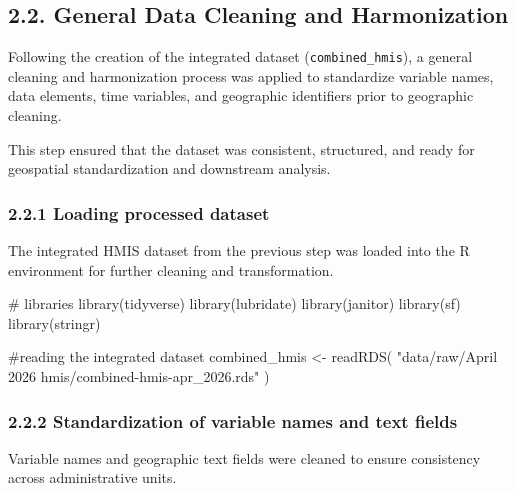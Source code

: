\documentclass[
  letterpaper,
  DIV=11,
  numbers=noendperiod]{scrartcl}
\newenvironment{Shaded}{\begin{snugshade}}{\end{snugshade}}
\newcommand{\CommentTok}[1]{\textcolor[rgb]{0.37,0.37,0.37}{#1}}
\newcommand{\FunctionTok}[1]{\textcolor[rgb]{0.28,0.35,0.67}{#1}}
\newcommand{\NormalTok}[1]{\textcolor[rgb]{0.00,0.23,0.31}{#1}}
\newcommand{\OtherTok}[1]{\textcolor[rgb]{0.00,0.23,0.31}{#1}}
\newcommand{\StringTok}[1]{\textcolor[rgb]{0.13,0.47,0.30}{#1}}
\begin{document}
\subsection{2.2. General Data Cleaning and
Harmonization}\label{general-data-cleaning-and-harmonization}

Following the creation of the integrated dataset
(\texttt{combined\_hmis}), a general cleaning and harmonization process
was applied to standardize variable names, data elements, time
variables, and geographic identifiers prior to geographic cleaning.

This step ensured that the dataset was consistent, structured, and ready
for geospatial standardization and downstream analysis.

\subsubsection{2.2.1 Loading processed
dataset}\label{loading-processed-dataset}

The integrated HMIS dataset from the previous step was loaded into the R
environment for further cleaning and transformation.

\begin{Shaded}
\begin{Highlighting}[]
\CommentTok{\# libraries }
\FunctionTok{library}\NormalTok{(tidyverse) }
\FunctionTok{library}\NormalTok{(lubridate) }
\FunctionTok{library}\NormalTok{(janitor) }
\FunctionTok{library}\NormalTok{(sf) }
\FunctionTok{library}\NormalTok{(stringr)}

\CommentTok{\#reading the integrated dataset}
\NormalTok{combined\_hmis }\OtherTok{\textless{}{-}} \FunctionTok{readRDS}\NormalTok{( }\StringTok{"data/raw/April 2026 hmis/combined{-}hmis{-}apr\_2026.rds"}\NormalTok{ )}
\end{Highlighting}
\end{Shaded}

\subsubsection{2.2.2 Standardization of variable names and text
fields}\label{standardization-of-variable-names-and-text-fields}

Variable names and geographic text fields were cleaned to ensure
consistency across administrative units.
\end{document}
